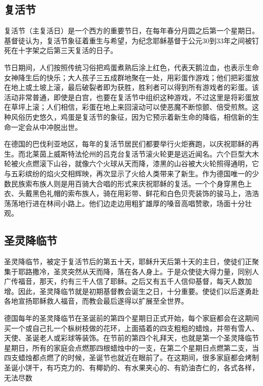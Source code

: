 \subsection{复活节}
\par
复活节（主复活日）是一个西方的重要节日，在每年春分月圆之后第一个星期日。基督徒认为，复活节象征着重生与希望，为纪念耶稣基督于公元30到33年之间被钉死在十字架之后第三天复活的日子。
\par
节日期间，人们按照传统习俗把鸡蛋煮熟后涂上红色，代表天鹅泣血，也表示生命女神降生后的快乐；大人孩子三五成群地聚在一处，用彩蛋作游戏；他们把彩蛋放在地上或土坡上滚，最后破裂者即为获胜，胜利者可以得到所有游戏者的彩蛋。该活动非常普通，即使是白宫，也要在复活节中组织这种游戏，不过这里是将彩蛋放在草坪上滚；人们相信，彩蛋在地上来回滚动可以使恶魔不断惊颤、倍受煎熬。这种风俗历史悠久，鸡蛋是复活节的象征，因为它预示着新生命的降临，相信新的生命一定会从中冲脱出世。
\par
在德国的巴伐利亚地区，每年的复活节居民们都要举行火炬赛跑，以庆祝耶稣的再生。而北莱茵上威斯特法伦州的吕克台复活节滚火轮更是远近闻名。六个巨型大木轮被火点燃滚下山谷，就像六个火球从天而降，漆黑的山谷被大火轮照得通明，它与五彩缤纷的焰火交相辉映，再次显示了火给人类带来了新生。作为德国唯一的少数民族索布族人则是用百骑大合唱的形式来庆祝耶稣的复活。一个个身穿黑色上衣、头戴黑色礼帽的索布族人，骑在用彩带、鲜花和白色贝壳装饰的骏马上，浩浩荡荡地行进在林间小路上。他们边走边用粗犷雄厚的嗓音高唱赞歌，场面十分壮观。

\subsection{圣灵降临节}
\par
圣灵降临节，被定于复活节后的第五十天，耶稣升天后第十天的主日，使徒们正聚集于耶路撒冷，圣灵突然从天而降，落在各人身上。于是众使徒大得力量，同别人广传福音，那天，约有三千人信了耶稣。之后又有五千人信仰基督，每天人数加增。因此，圣灵降临节就是初期基督教会诞生之日，十分重要。使徒们以后遂勇赴各地宣扬耶稣救人福音，而教会最后遂得以扩展至全世界。
\par
德国每年的圣灵降临节在圣诞前的第四个星期日正式开始，每个家庭都会在这期间买一个或自己扎一个枞树枝做的花环，上面插着的四支粗粗的蜡烛，并带有雪人、天使、圣诞老人或彩球等装饰。在节前的第四个礼拜天，也就是第一个圣灵降临节星期日，所有的家庭会点燃那四根蜡烛中的一支，在第二个星期日点燃第二支，当四支蜡烛都点燃了的时候，圣诞节也就近在眼前了。在这期间，很多家庭都会烤制圣诞小饼干，有巧克力的、有椰奶的、有水果夹心的、有奶油杏仁的，各式各样，无法尽数